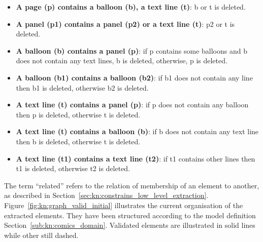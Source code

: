 \begin{itemize}
  \item \textbf{A page (p) contains a balloon (b), a text line (t)}: b or t is deleted.
  \item \textbf{A panel (p1) contains a panel (p2) or a text line (t)}: p2 or t is deleted.
  \item \textbf{A balloon (b) contains a panel (p)}: if p contains some balloons and b does not contain any text lines, b is deleted, otherwise, p is deleted.
  \item \textbf{A balloon (b1) contains a balloon (b2)}: if b1 does not contain any line then b1 is deleted, otherwise b2 is deleted.
  \item \textbf{A text line (t) contains a panel (p)}: if p does not contain any balloon then p is deleted, otherwise t is deleted.
  \item \textbf{A text line (t) contains a balloon (b)}: if b does not contain any text line then b is deleted, otherwise t is deleted.
  \item \textbf{A text line (t1) contains a text line (t2)}: if t1 contains other lines then t1 is deleted, otherwise t2 is deleted.
\end{itemize}

The term ``related'' refers to the relation of membership of an element to another, as described in Section~\ref{sec:kn:constrains_low_level_extraction}.
Figure~\ref{fig:kn:graph_valid_initial} illustrates the current organisation of the extracted elements.
They have been structured according to the model definition Section~\ref{sub:kn:comics_domain}.
Validated elements are illustrated in solid lines while other still dashed.



